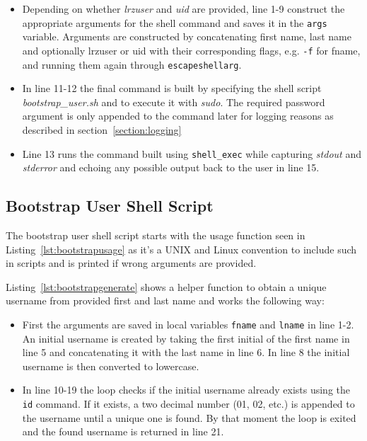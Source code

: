 \begin{itemize}
    \item Depending on whether \textit{lrzuser} and \textit{uid} are provided,
    line 1-9 construct the appropriate arguments for the shell command and saves
    it in the \texttt{args} variable. Arguments are constructed by concatenating
    first name, last name and optionally lrzuser or uid with their corresponding
    flags, e.g. \texttt{-f} for fname, and running them again through
    \texttt{escapeshellarg}.
    \item In line 11-12 the final command is built by specifying the shell
    script \textit{bootstrap\_user.sh} and to execute it with \textit{sudo}. The
    required password argument is only appended to the command later for logging
    reasons as described in section~\ref{section:logging}
    \item Line 13 runs the command built using \texttt{shell\_exec} while
    capturing \textit{stdout} and \textit{stderror} and echoing any possible
    output back to the user in line 15.
\end{itemize}

\subsection{Bootstrap User Shell Script}

The bootstrap user shell script starts with the usage function seen in
Listing~\ref{lst:bootstrapusage} as it's a UNIX and Linux convention to include
such in scripts and is printed if wrong arguments are provided.





Listing~\ref{lst:bootstrapgenerate} shows a helper function to obtain a unique
username from provided first and last name and works the following way:

\begin{itemize}
    \item First the arguments are saved in local variables \texttt{fname} and
    \texttt{lname} in line 1-2. An initial username is created by taking the
    first initial of the first name in line 5 and concatenating it with the last
    name in line 6. In line 8 the initial username is then converted to
    lowercase.
    \item In line 10-19 the loop checks if the initial username already exists
    using the \texttt{id} command. If it exists, a two decimal number (01, 02,
    etc.) is appended to the username until a unique one is found. By that
    moment the loop is exited and the found username is returned in line 21.
\end{itemize}

